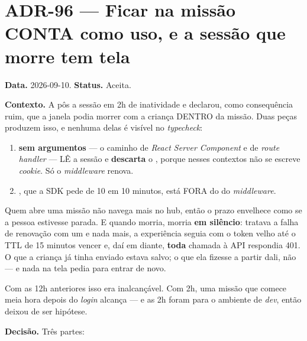 \section{ADR-96 --- Ficar na missão CONTA como uso, e a sessão que morre tem
tela}
\label{adr:sessao-conta-a-missao}

\textbf{Data.} 2026-09-10. \textbf{Status.} Aceita.

\textbf{Contexto.} A  pôs a sessão em 2h de inatividade e declarou,
como consequência ruim, que a janela podia morrer com a criança DENTRO da
missão. Duas peças produzem isso, e nenhuma delas é visível no
\emph{typecheck}:

\begin{enumerate}
  \item {} \textbf{sem argumentos} --- o caminho de \emph{React Server
    Component} e de \emph{route handler} --- LÊ a sessão e \textbf{descarta} o
    , porque nesses contextos não se escreve \emph{cookie}. Só o
    \emph{middleware} renova.
  \item {}, que a SDK pede de 10 em 10 minutos, está
    FORA do  do \emph{middleware}.
\end{enumerate}

Quem abre uma missão não navega mais no hub, então o prazo envelhece como se a
pessoa estivesse parada. E quando morria, morria \textbf{em silêncio}:
 tratava a falha de renovação com um
 e nada mais, a experiência seguia com o token velho até o TTL
de 15 minutos vencer e, daí em diante, \textbf{toda} chamada à API respondia
401. O que a criança já tinha enviado estava salvo; o que ela fizesse a partir
dali, não --- e nada na tela pedia para entrar de novo.

Com as 12h anteriores isso era inalcançável. Com 2h, uma missão que comece meia
hora depois do \emph{login} alcança --- e as 2h foram para o ambiente de
\emph{dev}, então deixou de ser hipótese.

\textbf{Decisão.} Três partes:

